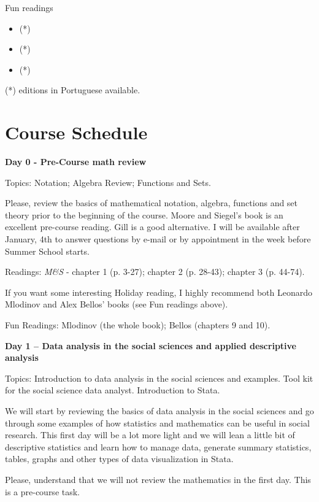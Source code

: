 \documentclass[a4paper,11pt]{article}
\begin{document}
Fun readings

\begin{itemize}
	\item {} (*)
	\item {} (*)
	\item {} (*)
\end{itemize}

(*) editions in Portuguese available.

\section{Course Schedule}

\textbf{Day 0 - Pre-Course math review}

Topics: Notation; Algebra Review; Functions and Sets.

Please, review the basics of mathematical notation, algebra, functions and set theory prior to the beginning of the course. Moore and Siegel's book is an excellent pre-course reading. Gill is a good alternative. I will be available after January, 4th to answer questions by e-mail or by appointment in the week before Summer School starts.

Readings: \emph{M\&S} - chapter 1 (p. 3-27); chapter 2 (p. 28-43); chapter 3 (p. 44-74).

If you want some interesting Holiday reading, I highly recommend both Leonardo Mlodinov and Alex Bellos' books (see Fun readings above).

Fun Readings: Mlodinov (the whole book); Bellos (chapters 9 and 10).


\textbf{Day 1 -- Data analysis in the social sciences and applied descriptive analysis}

Topics: Introduction to data analysis in the social sciences and examples. Tool kit for the social science data analyst. Introduction to Stata.

We will start by reviewing the basics of data analysis in the social sciences and go through some examples of how statistics and mathematics can be useful in social research. This first day will be a lot more light and we will lean a little bit of descriptive statistics and learn how to manage data, generate summary statistics, tables, graphs and other types of data visualization in Stata.

Please, understand that we will not review the mathematics in the first day. This is a pre-course task.
\end{document}
